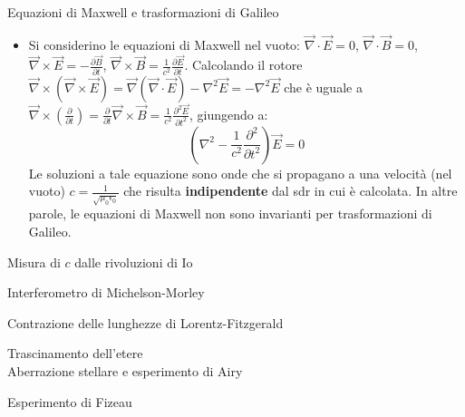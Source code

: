 \documentclass[a4_2,grid,frame]{flashcards}
\newenvironment{cartaflash}
    {\vspace{-15pt}
    \begin{itemize}
    }
    {
    \end{itemize}
    }
\begin{document}
\begin{flashcard}[Proprietà]{Equazioni di Maxwell e trasformazioni di Galileo}
\begin{cartaflash}
\item Si considerino le equazioni di Maxwell nel vuoto: $\vec{\nabla}\cdot \vec{E} = 0$, $\vec{\nabla}\cdot \vec{B} = 0$, $\vec{\nabla}\times\vec{E} = -\frac{\partial \vec{B}}{\partial t}$, $\vec{\nabla}\times\vec{B} = \frac{1}{c^2}\frac{\partial \vec{E}}{\partial t}$. Calcolando il rotore $\vec{\nabla}\times(\vec{\nabla} \times\vec{E}) = \vec{\nabla}(\vec{\nabla}\cdot \vec{E}) -\nabla^2 \vec{E} = -\nabla^2 \vec{E}$ che è uguale a $\vec{\nabla}\times\left (\frac{\partial}{\partial t}\right ) = \frac{\partial}{\partial t}\vec{\nabla}\times\vec{B} = \frac{1}{c^2}\frac{\partial^2 \vec{E}}{\partial t^2}$, giungendo a:
\[
\left (\nabla^2 -\frac{1}{c^2}\frac{\partial^2}{\partial t^2} \right ) \vec{E} = 0
\]
Le soluzioni a tale equazione sono onde che si propagano a una velocità (nel vuoto) $c = \frac{1}{\sqrt{\mu_0\epsilon_0}}$ che risulta \textbf{indipendente} dal sdr in cui è calcolata. In altre parole, le equazioni di Maxwell non sono invarianti per trasformazioni di Galileo. %
\end{cartaflash}
\end{flashcard}


\begin{flashcard}[Esperimento]{Misura di $c$ dalle rivoluzioni di Io}

\end{flashcard}

\begin{flashcard}[Esperimento]{Interferometro di Michelson-Morley}

\end{flashcard}

\begin{flashcard}[Teoria]{Contrazione delle lunghezze di Lorentz-Fitzgerald}

\end{flashcard}

\begin{flashcard}[Esperimento]{Trascinamento dell'etere\\Aberrazione stellare e esperimento di Airy}

\end{flashcard}

\begin{flashcard}[Esperimento]{Esperimento di Fizeau}

\end{flashcard}
\end{document}
